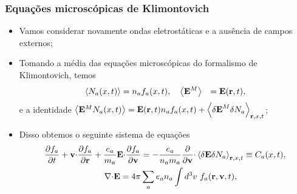 \documentclass[10pt,aspectratio=1610,lualatex]{beamer}
\begin{document}
\begin{frame}[noframenumbering]
  \frametitle{Equações microscópicas de Klimontovich}
  \begin{itemize}
\item Vamos considerar novamente ondas eletrostáticas e a ausência de campos
  externos;
\item Tomando a média das equações microscópicas do formalismo de Klimontovich,
  temos
  \begin{eqnarray}
  \left<N_a(x,t)\right>&=n_a f_a(x,t), \quad 
  \left<{\bf E}^M\right>&= {\bf E}({\bf r},t),
  \end{eqnarray}
  e a identidade $\left<{\bf E}^M N_a(x,t)\right> = {\bf E}({\bf r},t)n_af_a(x,t)
  + \left<{\delta \bf E}^M \delta N_a\right>_{{\bf r},x,t}$;
\item Disso obtemos o seguinte sistema de equações
  \begin{equation}
  \begin{split}
    \frac{\partial f_a}{\partial t}
    +{\bf v \cdot}\frac{\partial f_a}{\partial \bf r}
    +\frac{e_a}{m_a}{\bf E}{\bf \cdot}\frac{\partial f_a}{\partial \bf v}
    &=-\frac{e_a}{n_a m_a} \frac{\partial }{\partial \bf v}{\bf \cdot}
    \left<\delta{\bf E}\delta N_a\right>_{{\bf r},x,t}\equiv C_a(x,t),\\
    \nabla {\bf \cdot E}=4\pi& \sum_a e_a n_a \int d^3v\ f_a({\bf r,v},t),
  \end{split}
  \label{sist-av}
  \end{equation}
  \end{itemize}
\end{frame}
\end{document}
